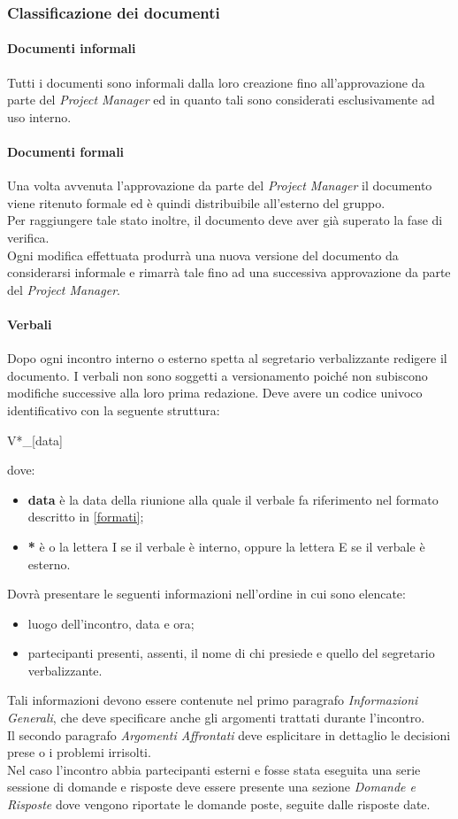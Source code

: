 \subsubsection{Classificazione dei documenti}
\paragraph{Documenti informali}\Spazio
Tutti i documenti sono informali dalla loro creazione fino all'approvazione da parte del \emph{Project Manager} ed in quanto tali sono considerati esclusivamente ad uso interno.
\paragraph{Documenti formali}\Spazio
Una volta avvenuta l'approvazione da parte del \emph{Project Manager} il documento viene ritenuto formale ed è quindi distribuibile all'esterno del gruppo.\\
Per raggiungere tale stato inoltre, il documento deve aver già superato la fase di verifica. \\
Ogni modifica effettuata produrrà una nuova versione del documento da considerarsi informale e rimarrà tale fino ad una successiva approvazione da parte del \emph{Project Manager}.
\paragraph{Verbali}\Spazio
\label{verbali}
Dopo ogni incontro interno o esterno spetta al segretario verbalizzante redigere il documento. I verbali non sono soggetti a versionamento poiché non subiscono modifiche successive alla loro prima redazione. Deve avere un codice univoco identificativo con la seguente struttura:
\newline
\centerline{V*\_[data]}
dove:
\begin{itemize}
	\item \textbf{data} è la data della riunione alla quale il verbale fa riferimento nel formato descritto in \ref{formati};
	\item \textbf{*} è o la lettera I se il verbale è interno, oppure la lettera E se il verbale è esterno.
\end{itemize}
Dovrà presentare le seguenti informazioni nell'ordine in cui sono elencate:
\begin{itemize}
	\item luogo dell'incontro, data e ora;
	\item partecipanti presenti, assenti, il nome di chi presiede e quello del segretario verbalizzante.
\end{itemize}
Tali informazioni devono essere contenute nel primo paragrafo \textit{Informazioni Generali}, che deve specificare anche gli argomenti trattati durante l'incontro.\\
Il secondo paragrafo \textit{Argomenti Affrontati} deve esplicitare in dettaglio le decisioni prese o i problemi irrisolti.\\
Nel caso l'incontro abbia partecipanti esterni e fosse stata eseguita una serie sessione di domande e risposte deve essere presente una sezione  \textit{Domande e Risposte} dove vengono riportate le domande poste, seguite dalle risposte date.
